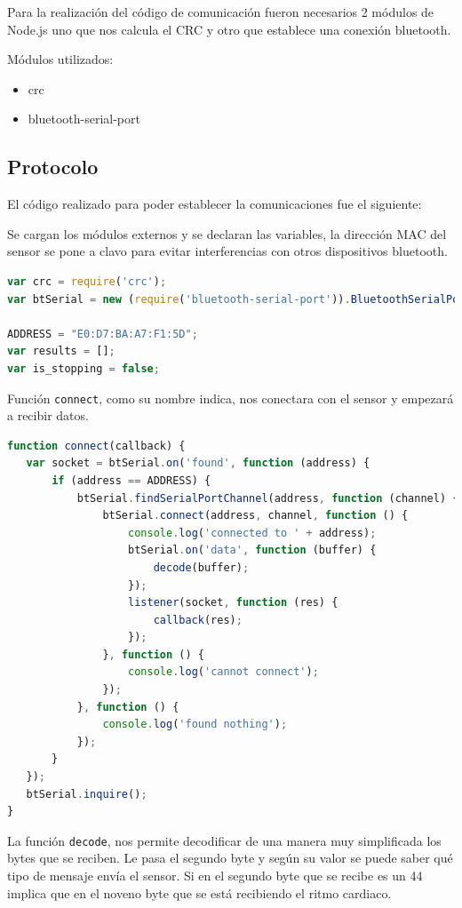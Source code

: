 Para la realización del código de comunicación fueron necesarios 2 módulos de Node.js uno que nos calcula el CRC y otro que establece una conexión bluetooth.

Módulos utilizados:

\begin{itemize}
\item crc
\item bluetooth-serial-port 
\end{itemize}
\pagebreak

\subsection{Protocolo}

El código realizado para poder establecer la comunicaciones fue el siguiente:
 
Se cargan los módulos externos y se declaran las variables, la dirección MAC del sensor se pone a clavo para evitar interferencias con otros dispositivos bluetooth.

\begin{lstlisting}[language=JavaScript]
var crc = require('crc');
var btSerial = new (require('bluetooth-serial-port')).BluetoothSerialPort();

ADDRESS = "E0:D7:BA:A7:F1:5D";
var results = [];
var is_stopping = false;
\end{lstlisting}

Función \texttt{connect}, como su nombre indica, nos conectara con el sensor y empezará a recibir datos. 

\begin{lstlisting}[language=JavaScript]
function connect(callback) {
   var socket = btSerial.on('found', function (address) {
       if (address == ADDRESS) {
           btSerial.findSerialPortChannel(address, function (channel) {
               btSerial.connect(address, channel, function () {
                   console.log('connected to ' + address);
                   btSerial.on('data', function (buffer) {
                       decode(buffer);
                   });
                   listener(socket, function (res) {
                       callback(res);
                   });
               }, function () {
                   console.log('cannot connect');
               });
           }, function () {
               console.log('found nothing');
           });
       }
   });
   btSerial.inquire();
}
\end{lstlisting}

La función \texttt{decode}, nos permite decodificar de una manera muy simplificada los bytes que se reciben. Le pasa el segundo byte y según su valor se puede saber qué tipo de mensaje envía el sensor. Si en el segundo byte que se recibe es un 44 implica que en el noveno byte que se está recibiendo el ritmo cardiaco.


